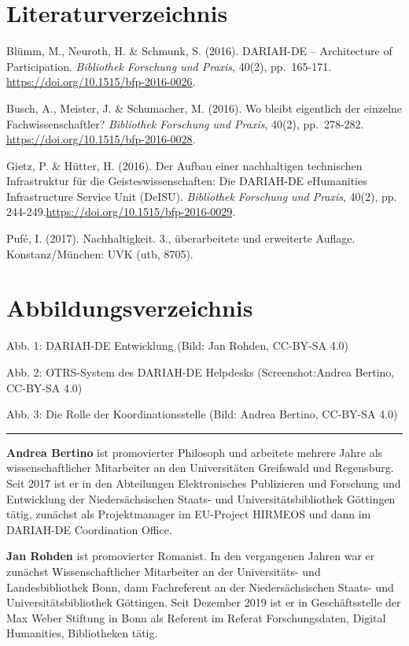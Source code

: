 \documentclass[a4paper,
fontsize=11pt,
oneside,
numbers=noperiodatend,
parskip=half-,
bibliography=totoc,
final
]{scrartcl}
\begin{document}
\hypertarget{literaturverzeichnis}{%
\section{Literaturverzeichnis}\label{literaturverzeichnis}}

Blümm, M., Neuroth, H. \& Schmunk, S. (2016). DARIAH-DE -- Architecture
of Participation. \emph{Bibliothek Forschung und Praxis}, 40(2),
pp.~165-171. \url{https://doi.org/10.1515/bfp-2016-0026}.

Busch, A., Meister, J. \& Schumacher, M. (2016). Wo bleibt eigentlich
der einzelne Fachwissenschaftler? \emph{Bibliothek Forschung und
Praxis}, 40(2), pp.~278-282.
\url{https://doi.org/10.1515/bfp-2016-0028}.

Gietz, P. \& Hütter, H. (2016). Der Aufbau einer nachhaltigen
technischen Infrastruktur für die Geisteswissenschaften: Die DARIAH-DE
eHumanities Infrastructure Service Unit (DeISU). \emph{Bibliothek
Forschung und Praxis}, 40(2), pp.
244-249.\url{https://doi.org/10.1515/bfp-2016-0029}.

Pufé, I. (2017). Nachhaltigkeit. 3., überarbeitete und erweiterte
Auflage. Konstanz/München: UVK (utb, 8705).

\hypertarget{abbildungsverzeichnis}{%
\section{Abbildungsverzeichnis}\label{abbildungsverzeichnis}}

Abb. 1: DARIAH-DE Entwicklung (Bild: Jan Rohden, CC-BY-SA 4.0)

Abb. 2: OTRS-System des DARIAH-DE Helpdesks (Screenshot:Andrea Bertino,
CC-BY-SA 4.0)

Abb. 3: Die Rolle der Koordinationsstelle (Bild: Andrea Bertino,
CC-BY-SA 4.0)

\begin{center}\rule{0.5\linewidth}{\linethickness}\end{center}

\textbf{Andrea Bertino} ist promovierter Philosoph und arbeitete mehrere
Jahre als wissenschaftlicher Mitarbeiter an den Universitäten Greifswald
und Regensburg. Seit 2017 ist er in den Abteilungen Elektronisches
Publizieren und Forschung und Entwicklung der Niedersächsischen Staats-
und Universitätsbibliothek Göttingen tätig, zunächst als Projektmanager
im EU-Project HIRMEOS und dann im DARIAH-DE Coordination Office.

\textbf{Jan Rohden } ist promovierter Romanist. In den vergangenen
Jahren war er zunächst Wissenschaftlicher Mitarbeiter an der
Universitäts- und Landesbibliothek Bonn, dann Fachreferent an der
Niedersächsischen Staats- und Universitätsbibliothek Göttingen. Seit
Dezember 2019 ist er in Geschäftsstelle der Max Weber Stiftung in Bonn
als Referent im Referat Forschungsdaten, Digital Humanities,
Bibliotheken tätig.
\end{document}
